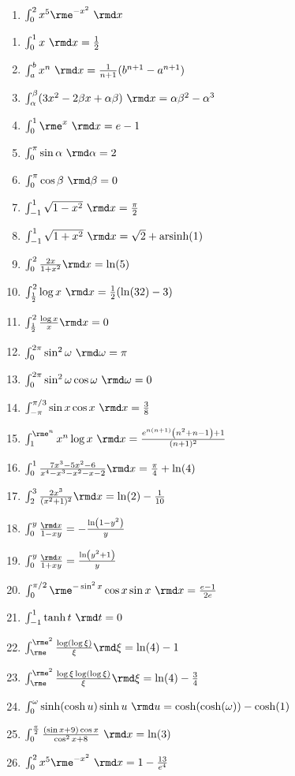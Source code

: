 \documentclass[11pt,answers]{exam}
\begin{document}
\begin{questions}
{\begin{enumerate}
\item $\int_0^2 x^5\rme^{-x^2}~\rmd x$  
\end{enumerate}}
\begin{solution}
\begin{enumerate}
\item $\int_0^1 x~\rmd x=\frac{1}{2}$  
\item $\int_a^b x^n~\rmd x=\frac{1}{n+1}(b^{n+1}-a^{n+1})$
\item $\int_\alpha^\beta (3x^2-2\beta x+\alpha\beta)~\rmd x=\alpha  \beta ^2-\alpha ^3$  
\item $\int_0^1 \rme^x~\rmd x=e-1$ 
\item $\int_0^\pi \sin\alpha~\rmd\alpha=2$  
\item $\int_0^\pi \cos\beta~\rmd\beta=0$  
\item $\int_{-1}^1\sqrt{1-x^2}~\rmd x=\frac{\pi}{2}$  
\item $\int_{-1}^1\sqrt{1+x^2}~\rmd x=\sqrt{2}+\text{arsinh}(1)$  
\item $\int_0^2 \frac{2x}{1+x^2}\rmd x=\ln(5)$  
\item $\int_{\frac{1}{2}}^2\log x~\rmd x=\frac{1}{2} (\ln (32)-3)$  
\item $\int_{\frac{1}{2}}^2\frac{\log x}{x}\rmd x=0$  
\item $\int_0^{2\pi}\sin^2\omega~\rmd\omega=\pi$  
\item $\int_0^{2\pi}\sin^2\omega\cos\omega~\rmd\omega=0$  
\item $\int_{-\pi}^{\pi/3}\sin x\cos x~\rmd x=\frac{3}{8}$  
\item $\int_1^{\rme^n} x^n\log x~\rmd x=\frac{e^{n (n+1)} 
\left(n^2+n-1\right)+1}{(n+1)^2}$  
\item $\int_0^1 \frac{7 x^3-5 x^2-6}{x^4-x^3-x^2-x-2}\rmd x=\frac{\pi }{4}+\ln (4)$  
\item $\int_2^3 \frac{2 x^3}{(x^2+1)^2}\rmd x=\ln (2)-\frac{1}{10}$  
\item $\int_0^y \frac{\rmd x}{1-xy}=-\frac{\ln \left(1-y^2\right)}{y}$
\item $\int_0^y \frac{\rmd x}{1+xy}=\frac{\ln \left(y^2+1\right)}{y}$
\item $\int_0^{\pi/2}\rme^{-\sin^2 x}\cos x\sin x~\rmd x=\frac{e-1}{2 e}$  
\item $\int_{-1}^1\tanh t~\rmd t=0$  
\item $\int_\rme^{\rme^2}\frac{\log(\log \xi)}{\xi}\rmd\xi=\ln (4)-1$  
\item $\int_\rme^{\rme^2}\frac{\log\xi \log(\log \xi)}{\xi}\rmd\xi=\ln (4)-\frac{3}{4}$  
\item $\int_0^\omega \sinh(\cosh u)\sinh u~\rmd u=\cosh (\cosh (\omega ))-\cosh (1)$  
\item $\int_0^{\frac{\pi }{2}} \frac{(\sin x+9) \cos x}{\cos^2 x +8}~\rmd x=\ln (3)$  
\item $\int_0^2 x^5\rme^{-x^2}~\rmd x=1-\frac{13}{e^4}$  
\end{enumerate}
\end{solution}



\end{questions}
\end{document}
